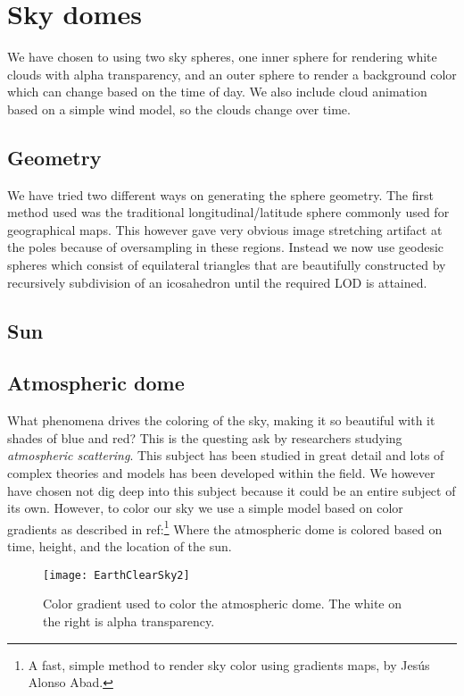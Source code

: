 \section{Sky domes}
We have chosen to using two sky spheres, one inner sphere for
rendering white clouds with alpha transparency, and an outer sphere to
render a background color which can change based on the time of day.
We also include cloud animation based on a simple wind model, so
the clouds change over time.

\subsection{Geometry}
We have tried two different ways on generating the sphere
geometry. The first method used was the traditional longitudinal/latitude
sphere commonly used for geographical maps. This
however gave very obvious image stretching artifact at the poles
because of oversampling in these regions. Instead we now use geodesic
spheres which consist of equilateral triangles that are beautifully
constructed by recursively subdivision of an icosahedron until the
required LOD is attained.

\subsection{Sun}

\subsection{Atmospheric dome}
What phenomena drives the coloring of the sky, making it so beautiful
with it shades of blue and red?
This is the questing ask by researchers studying 
\emph{atmospheric scattering}. This subject has been studied in great detail
and lots of complex theories and models has been developed within the field.
We however have chosen not dig deep into this subject because it could
be an entire subject of its own.
%
However, to color our sky we use a simple model based on color
gradients as described in ref:\footnote{A fast, simple method to
  render sky color using gradients maps, by Jesús Alonso Abad.}
Where the atmospheric dome is colored based on time, height, and the
location of the sun.

\begin{figure}[!h]
  \centering
  \texttt{[image: EarthClearSky2]}
  \caption{Color gradient used to color the atmospheric dome. The
    white on the right is alpha transparency.}
  \label{fig:sky-gradient}
\end{figure}

